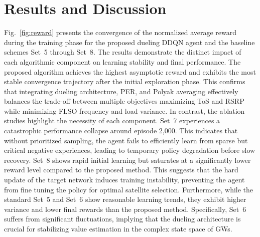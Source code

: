 \section{Results and Discussion}
\quad Fig.~\ref{fig:reward} presents the convergence of the normalized average reward during the training phase for the proposed dueling DDQN agent and the baseline schemes Set~5 through Set~8. The results demonstrate the distinct impact of each algorithmic component on learning stability and final performance. The proposed algorithm achieves the highest asymptotic reward and exhibits the most stable convergence trajectory after the initial exploration phase. This confirms that integrating dueling architecture, PER, and Polyak averaging effectively balances the trade-off between multiple objectives maximizing ToS and RSRP while minimizing FLSO frequency and load variance. In contrast, the ablation studies highlight the necessity of each component. Set~7 experiences a catastrophic performance collapse around episode 2,000. This indicates that without prioritized sampling, the agent fails to efficiently learn from sparse but critical negative experiences, leading to temporary policy degradation before slow recovery. Set~8 shows rapid initial learning but saturates at a significantly lower reward level compared to the proposed method. This suggests that the hard update of the target network induces training instability, preventing the agent from fine tuning the policy for optimal satellite selection. Furthermore, while the standard Set~5 and Set~6 show reasonable learning trends, they exhibit higher variance and lower final rewards than the proposed method. Specifically, Set~6 suffers from significant fluctuations, implying that the dueling architecture is crucial for stabilizing value estimation in the complex state space of GWs.

